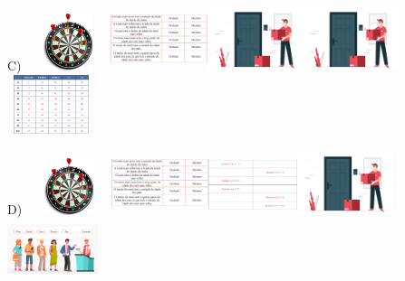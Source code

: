 \begin{escolha}
\begin{escolha}
{{{{C)
\includegraphics[width=0.98131in,height=0.65625in]{media/image108.png}\includegraphics[width=1.10972in,height=0.74212in]{media/image109.png}\includegraphics[width=1.09268in,height=0.73073in]{media/image112.png}\includegraphics[width=1.09268in,height=0.73073in]{media/image112.png}\includegraphics[width=1.01042in,height=0.67572in]{media/image111.png}

D)
\includegraphics[width=0.98131in,height=0.65625in]{media/image108.png}\includegraphics[width=1.10972in,height=0.74212in]{media/image109.png}\includegraphics[width=1.02736in,height=0.68704in]{media/image110.png}\includegraphics[width=1.09268in,height=0.73073in]{media/image112.png}\includegraphics[width=1.04264in,height=0.69727in]{media/image113.png}

}}}}
\end{escolha}
\end{escolha}
